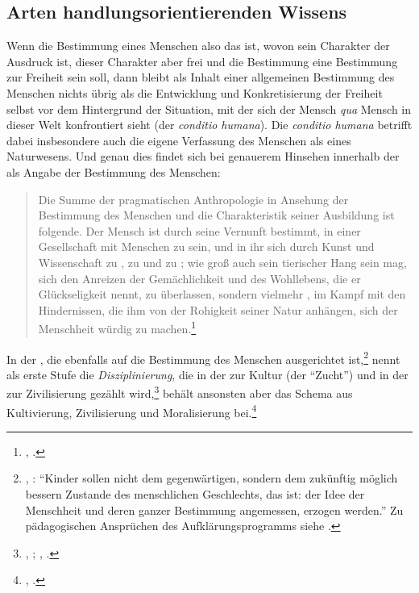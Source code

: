 \subsection{Arten handlungsorientierenden
Wissens}\label{subsection:aufklaerungundpraxis} Wenn die Bestimmung eines
Menschen also das ist, wovon sein Charakter der Ausdruck ist, dieser Charakter aber frei und die Bestimmung eine Bestimmung zur Freiheit sein soll, dann bleibt als
Inhalt einer allgemeinen Bestimmung des Menschen nichts übrig als die
Entwicklung und Konkretisierung der Freiheit selbst vor dem Hintergrund der
Situation, mit der sich der Mensch \emph{qua} Mensch in dieser Welt konfrontiert
sieht (der \emph{conditio humana}). Die \emph{conditio humana} betrifft dabei insbesondere
auch die eigene Verfassung des Menschen als eines Naturwesens. Und genau dies
findet sich bei genauerem Hinsehen innerhalb der  als Angabe der Bestimmung des Menschen:
\begin{quote}
  \label{Zitat:KultivierungZivilisierungMoralisierungalsBestimmungdesMenschen}Die
  Summe der pragmatischen Anthropologie in Ansehung der Bestimmung des Menschen
  und die Charakteristik seiner Ausbildung ist folgende. Der Mensch ist durch
  seine Vernunft bestimmt, in einer Gesellschaft mit Menschen zu sein, und in
  ihr sich durch Kunst und Wissenschaft zu , zu
   und zu ; wie groß auch sein tierischer
  Hang sein mag, sich den Anreizen der Gemächlichkeit und des Wohllebens, die er
  Glückseligkeit nennt,  zu überlassen, sondern vielmehr
  , im Kampf mit den Hindernissen, die ihm von der Rohigkeit seiner
  Natur anhängen, sich der Menschheit würdig zu
  machen.\footnote{\cite[A~321]{Kant:AnthropologieinpragmatischerHinsicht1977},
  \cite[VII: 324.33--325.4]{Kant:GesammelteWerke1900ff.}.}
\end{quote}
In der , die ebenfalls auf die Bestimmung des Menschen
ausgerichtet ist,\footnote{\cite[Vgl.][A 17]{Kant:UeberPaedagogik1977},
\cite[IX:
447.30--33]{Kant:GesammelteWerke1900ff.}: \enquote{Kinder sollen nicht dem
gegenwärtigen, sondern dem zukünftig möglich bessern Zustande des menschlichen
Geschlechts, das ist: der Idee der Menschheit und deren ganzer Bestimmung
angemessen, erzogen werden.} Zu pädagogischen Ansprüchen des
Aufklärungsprogramms siehe \cite[][\pno~513\,f.]{Theis:KantetlAufklaerung2012}.}
nennt  als erste Stufe die
\emph{Disziplinierung}, die in der  zur Kultur (der \enquote{Zucht}) und in der 
zur Zivilisierung gezählt
wird,\footnote{\cite[Vgl.][B~392]{Kant:KritikderUrteilskraft2009}, \cite[V:
432.3--12]{Kant:GesammelteWerke1900ff.}; \cite[A
319]{Kant:AnthropologieinpragmatischerHinsicht1977}, \cite[VII:
323.26]{Kant:GesammelteWerke1900ff.}.} behält ansonsten aber das Schema aus
Kultivierung, Zivilisierung und Moralisierung
bei.\footnote{\cite[Vgl.][A~22f.]{Kant:UeberPaedagogik1977}, \cite[IX:
449.27--450.14]{Kant:GesammelteWerke1900ff.}.}

